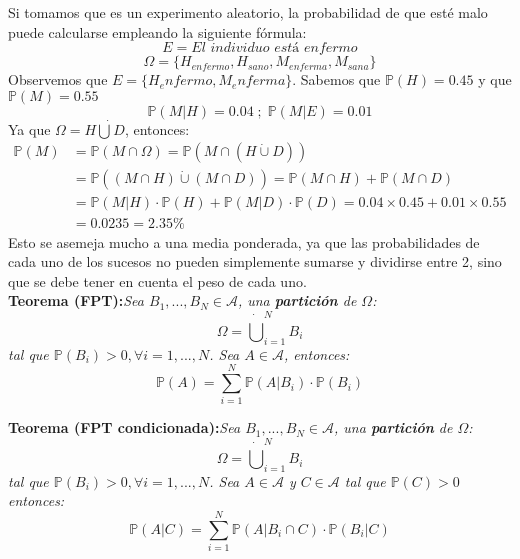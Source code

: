 \documentclass[11pt]{article}
\newcommand{\prob}{\mathbb{P}}
\newcommand{\OMG}{\varOmega}
\theoremstyle{plain}
\begin{document}
            Si tomamos que es un experimento aleatorio, la probabilidad de que esté malo puede calcularse empleando la siguiente fórmula:
            \[E = \textit{El individuo está enfermo}\]
            \[\OMG = \{H_{enfermo},H_{sano},M_{enferma},M_{sana}\}\]
            Observemos que $E = \{H_enfermo, M_enferma\}$. Sabemos que $\prob(H) = 0.45$ y que $\prob(M) = 0.55$
            \[\prob (M|H) = 0.04 \; ; \; \prob(M|E) = 0.01\]
            Ya que $\OMG = H \dot{\bigcup} D$, entonces:
            \begin{equation}
                \begin{aligned}
                    \prob(M) & = \prob(M\cap \OMG ) = \prob (M \cap (H \dot{\cup} D))\\
                    & = \prob ((M\cap H) \dot{\cup} (M\cap D)) = \prob(M\cap H) + \prob(M \cap D)\\
                    & = \prob(M|H) \cdot \prob(H) + \prob(M|D)\cdot\prob (D) = 0.04 \times 0.45 + 0.01 \times 0.55\\
                    & =0.0235 = 2.35\%
                \end{aligned}
            \end{equation}
            Esto se asemeja mucho a una media ponderada, ya que las probabilidades de cada uno de los sucesos no pueden simplemente sumarse y dividirse entre 2, sino que se debe tener en cuenta el peso de cada uno.\\

            \textbf{Teorema (FPT):}\textit{Sea $B_1,...,B_N \in \mathcal{A}$, una \textbf{partición} de $\OMG$:} 
            \[ \OMG = \dot{\bigcup}_{i=1}^{N} B_i \]
            \textit{tal que $\prob(B_i) > 0, \forall i = 1,...,N$. Sea $A\in \mathcal{A}$, entonces:}
            \begin{equation}
                \prob(A) = \sum_{i = 1}^{N} \prob(A|B_i) \cdot \prob (B_i)
            \end{equation}

            \textbf{Teorema (FPT condicionada):}\textit{Sea $B_1,...,B_N \in \mathcal{A}$, una \textbf{partición} de $\OMG$:} 
            \[ \OMG = \dot{\bigcup}_{i=1}^{N} B_i \]
            \textit{tal que $\prob(B_i) > 0, \forall i = 1,...,N$. Sea $A\in \mathcal{A}$ y $C\in \mathcal{A}$ tal que $\prob(C)> 0$ entonces:}
            \begin{equation}
                \prob(A|C) = \sum_{i = 1}^{N} \prob(A|B_i\cap C) \cdot \prob (B_i|C)
            \end{equation}
\end{document}
